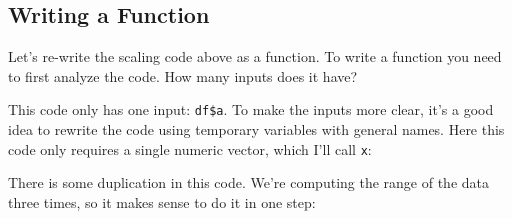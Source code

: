 \documentclass[]{book}
\newenvironment{Shaded}{\begin{snugshade}}{\end{snugshade}}
\newcommand{\KeywordTok}[1]{\textcolor[rgb]{0.13,0.29,0.53}{\textbf{#1}}}
\newcommand{\DataTypeTok}[1]{\textcolor[rgb]{0.13,0.29,0.53}{#1}}
\newcommand{\DecValTok}[1]{\textcolor[rgb]{0.00,0.00,0.81}{#1}}
\newcommand{\StringTok}[1]{\textcolor[rgb]{0.31,0.60,0.02}{#1}}
\newcommand{\CommentTok}[1]{\textcolor[rgb]{0.56,0.35,0.01}{\textit{#1}}}
\newcommand{\OperatorTok}[1]{\textcolor[rgb]{0.81,0.36,0.00}{\textbf{#1}}}
\newcommand{\NormalTok}[1]{#1}
\begin{document}
\subsection{Writing a Function}\label{writing-a-function}

Let's re-write the scaling code above as a function. To write a function
you need to first analyze the code. How many inputs does it have?

\begin{Shaded}
\end{Shaded}

This code only has one input: \texttt{df\$a}. To make the inputs more
clear, it's a good idea to rewrite the code using temporary variables
with general names. Here this code only requires a single numeric
vector, which I'll call \texttt{x}:

\begin{Shaded}
\end{Shaded}

There is some duplication in this code. We're computing the range of the
data three times, so it makes sense to do it in one step:
\end{document}
